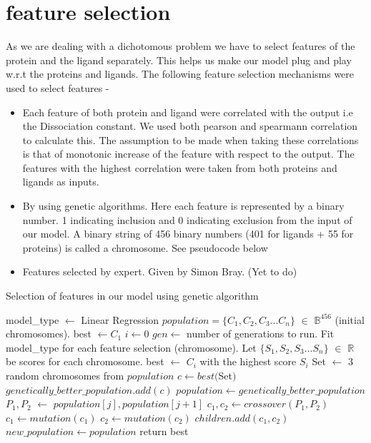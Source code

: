 \documentclass[11pt]{article}
\begin{document}
\section{feature selection}
As we are dealing with a dichotomous problem we have to select features of the protein and the ligand separately.
This helps us make our model plug and play w.r.t the proteins and ligands.
The following feature selection mechanisms were used to select features -

\begin{itemize}
\item Each feature of both protein and ligand were correlated with the output i.e the Dissociation constant.
We used both pearson and spearmann correlation to calculate this.
The assumption to be made when taking these correlations is that of monotonic increase of
the feature with respect to the output.
The features with the highest correlation were taken from both proteins and ligands as
inputs.
\item By using genetic algorithms\cite{genetic_algorithm}.
Here each feature is represented by a binary number.
1 indicating inclusion and 0 indicating exclusion from the input of our model.
A binary string of 456 binary numbers (401 for ligands + 55 for proteins) is called a chromosome.
See pseudocode below
\item Features selected by expert. Given by Simon Bray. (Yet to do)
\end{itemize}

\label{Genetic_Algo}
\begin{algorithm}
\caption{Selection of features in our model using genetic algorithm \cite{genetic_algorithm}}
\begin{algorithmic}[1]
\State model\_type $\gets$ Linear Regression
\State $ population = \{C_1, C_2, C_3... C_n\}$ $\in$ $\mathbb{B}^{456}$ (initial chromosomes).
\State best $\gets C_1$ 
\State $i \gets 0$
\State $gen \gets$ number of generations to run.
          \State Fit model\_type for each feature selection (chromosome). 
          \State Let $\{S_1, S_2, S_3... S_n\}$ $\in$ $\mathbb{R}$ be scores for each chromosome.
          \State best $\gets$ $C_i$ with the highest score $S_i$
              \State Set $\gets$ 3 random chromosomes from $population$
              \State $c \gets best($Set$)$
              \State $genetically\_better\_population.add(c)$
          \EndFor
          \State $population \gets genetically\_better\_population$
              \State $P_1, P_2$ $\gets$ $population[j], population[j+1]$
              \State $c_1, c_2 \gets crossover(P_1, P_2)$
              \State $c_1 \gets mutation(c_1)$
              \State $c_2 \gets mutation(c_2)$
              \State $children.add(c_1, c_2)$
          \EndFor
      \State $new\_population \gets population$
      \EndFor
\State return best
\EndProcedure
\end{algorithmic}
\end{algorithm}
\end{document}
